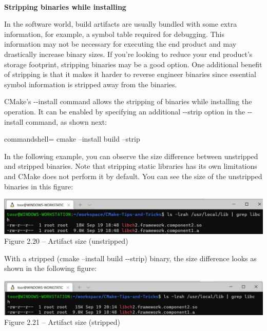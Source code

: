 \hspace*{\fill} \\ %
\noindent
\textbf{Stripping binaries while installing}

In the software world, build artifacts are usually bundled with some extra information, for example, a symbol table required for debugging. This information may not be necessary for executing the end product and may drastically increase binary sizes. If you're looking to reduce your end product's storage footprint, stripping binaries may be a good option. One additional benefit of stripping is that it makes it harder to reverse engineer binaries since essential symbol information is stripped away from the binaries.

CMake's -{}-install command allows the stripping of binaries while installing the operation. It can be enabled by specifying an additional -{}-strip option in the -{}-install command, as shown next:

\begin{tcblisting}{commandshell={}}
cmake --install build --strip
\end{tcblisting}

In the following example, you can observe the size difference between unstripped and stripped binaries. Note that stripping static libraries has its own limitations and CMake does not perform it by default. You can see the size of the unstripped binaries in this figure:

\begin{center}
\includegraphics[width=1.\textwidth]{content/1/chapter2/images/20.jpg}\\
Figure 2.20 – Artifact size (unstripped)
\end{center}

With a stripped (cmake –install build -{}-strip) binary, the size difference looks as shown in the following figure:

\begin{center}
\includegraphics[width=1.\textwidth]{content/1/chapter2/images/21.jpg}\\
Figure 2.21 – Artifact size (stripped)
\end{center}

